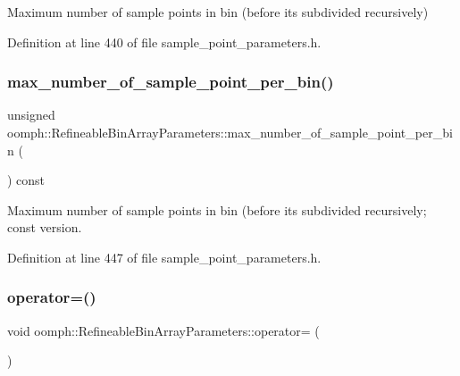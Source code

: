 Maximum number of sample points in bin (before it\textquotesingle{}s subdivided recursively) 



Definition at line 440 of file sample\+\_\+point\+\_\+parameters.\+h.

\mbox{\label{classoomph_1_1RefineableBinArrayParameters_a0a9b5ec5cb8b505a4166e9edacc2b964}} 
\subsubsection{\texorpdfstring{max\+\_\+number\+\_\+of\+\_\+sample\+\_\+point\+\_\+per\+\_\+bin()}{max\_number\_of\_sample\_point\_per\_bin()}\hspace{0.1cm}{\footnotesize\ttfamily [2/2]}}
{\footnotesize\ttfamily unsigned oomph\+::\+Refineable\+Bin\+Array\+Parameters\+::max\+\_\+number\+\_\+of\+\_\+sample\+\_\+point\+\_\+per\+\_\+bin (\begin{DoxyParamCaption}{ }\end{DoxyParamCaption}) const\hspace{0.3cm}{\ttfamily [inline]}}



Maximum number of sample points in bin (before it\textquotesingle{}s subdivided recursively; const version. 



Definition at line 447 of file sample\+\_\+point\+\_\+parameters.\+h.

\mbox{\label{classoomph_1_1RefineableBinArrayParameters_a5b307d5acebd67ad9ce7745b848da5a6}} 
\subsubsection{\texorpdfstring{operator=()}{operator=()}}
{\footnotesize\ttfamily void oomph\+::\+Refineable\+Bin\+Array\+Parameters\+::operator= (\begin{DoxyParamCaption}\item[{const \hyperlink{classoomph_1_1RefineableBinArrayParameters}{Refineable\+Bin\+Array\+Parameters} \&}]{ }\end{DoxyParamCaption})\hspace{0.3cm}{\ttfamily [inline]}}



